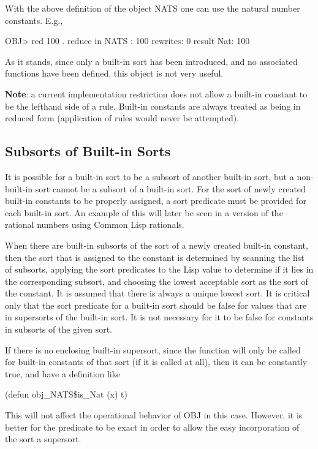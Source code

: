 With the above definition of the object NATS one can use the
natural number constants.  E.g.,

\bobj
OBJ> red 100 .
reduce in NATS : 100
rewrites: 0
result Nat: 100
\eobj

\noindent As it stands, since only a built-in sort has been
introduced, and no associated functions have been defined, this object
is not very useful.

{\bf Note}: a current implementation restriction does not allow a
built-in constant to be the lefthand side of a rule.  Built-in constants
are always treated as being in reduced form (application of rules
would never be attempted).

\subsection{Subsorts of Built-in Sorts}

It is possible for a built-in sort to be a subsort of another built-in
sort, but a non-built-in sort cannot be a subsort of a built-in sort.
For the sort of newly created built-in constants to be properly
assigned, a sort predicate must be provided for each built-in sort.
An example of this will later be seen in a version of the rational
numbers using Common Lisp rationals.

When there are built-in subsorts of the sort of a newly created
built-in constant, then the sort that is assigned to the constant is
determined by scanning the list of subsorts, applying the sort
predicates to the Lisp value to determine if it lies in the
corresponding subsort, and choosing the lowest acceptable sort as the
sort of the constant.  It is assumed that there is always a unique
lowest sort.  It is critical only that the sort predicate for a
built-in sort should be false for values that are in supersorts of the
built-in sort.  It is not necessary for it to be false for constants
in subsorts of the given sort.

If there is no enclosing built-in supersort, since the
 function will only be called for built-in
constants of that sort (if it is called at all), then it can be
constantly true, and have a definition like

\bobj
(defun obj_NATS\$is_Nat (x) t)
\eobj

\noindent This will not affect the operational behavior of OBJ in this
case.  However, it is better for the predicate to be exact in order to
allow the easy incorporation of the sort a supersort.

